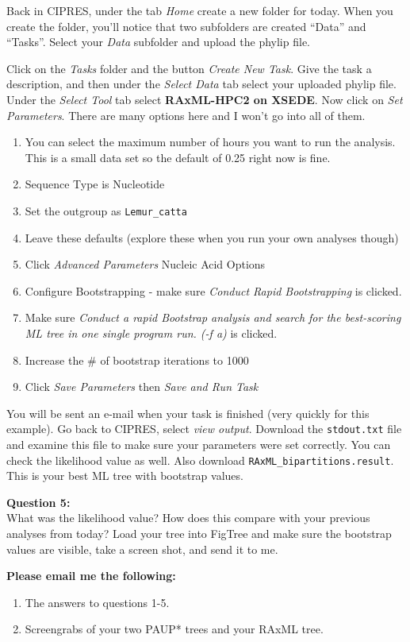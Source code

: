 \documentclass[11pt]{article}
\begin{document}
Back in CIPRES, under the tab \textit{Home} create a new folder for today.  
When you create the folder, you’ll notice that two subfolders are created ``Data'' and ``Tasks''.
Select your \textit{Data} subfolder and upload the phylip file.

Click on the \textit{Tasks} folder and the button \textit{Create New Task}.
Give the task a description, and then
under the \textit{Select Data} tab select your uploaded phylip file.
Under the \textit{Select Tool} tab select \textbf{RAxML-HPC2 on XSEDE}.
Now click on \textit{Set Parameters}. There are many options here and I won't go into all of them.  

\begin{enumerate}
\item  You can select the maximum number of hours you want to run the analysis. This is a small data set so the default of 0.25 right now is fine.
\item  Sequence Type is Nucleotide
\item  Set the outgroup as \texttt{Lemur\_catta}
\item  Leave these defaults (explore these when you run your own analyses though)
\item  Click \textit{Advanced Parameters} Nucleic Acid Options
\item  Configure Bootstrapping - make sure \textit{Conduct Rapid Bootstrapping} is clicked.
\item  Make sure \textit{Conduct a rapid Bootstrap analysis and search for the best-scoring ML tree in one single program run. (-f a)} is clicked.
\item Increase the \# of bootstrap iterations to 1000
\item Click \textit{Save Parameters} then \textit{Save and Run Task}
\end{enumerate}

You will be sent an e-mail when your task is finished (very quickly for this example).  Go back to CIPRES, select \textit{view output}.  
Download the \texttt{stdout.txt} file and examine this file to make sure your parameters were set correctly.  
You can check the likelihood value as well.  
Also download \texttt{RAxML\_bipartitions.result}.  
This is your best ML tree with bootstrap values.

\begin{framed}
\noindent
\textbf{Question 5:} \\
What was the likelihood value?  How does this compare with your previous analyses from today?  Load your tree into FigTree and make sure the bootstrap values are visible, take a screen shot, and send it to me. 
\end{framed}

\begin{framed}
\noindent
\textbf{Please email me the following:}
\begin{enumerate}
  \item The answers to questions 1-5.
  \item Screengrabs of your two PAUP* trees and your RAxML tree.
\end{enumerate}
\end{framed}


 
\end{document}
